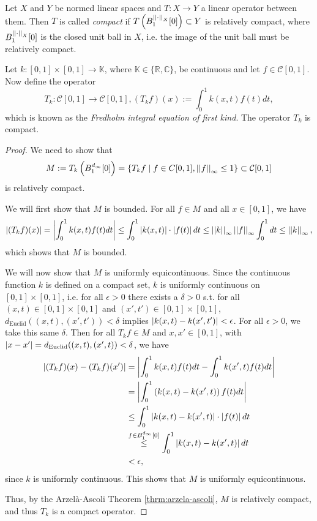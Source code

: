 \begin{defn}\label{defn:compact_operator}
	Let $X$ and $Y$ be normed linear spaces and $T: X\to Y$ a linear operator between them. Then $T$ is called \textit{compact} if $T\left(B^{\left\vert\left\vert \cdot \right\vert\right\vert_{X}}_{1}[0]\right) \subset Y$ is relatively compact, where $B_{1}^{\left\vert\left\vert \cdot \right\vert\right\vert_{X}}[0]$ is the closed unit ball in $X$, i.e. the image of the unit ball must be relatively compact.
\end{defn}

\begin{exmp}\label{exmp:compact-operator}
	Let $k: [0, 1]\times [0, 1]\to\mathbb K$, where $\mathbb K\in \{\mathbb R, \mathbb C\}$, be continuous and let $f\in \mathcal C[0, 1]$. Now define the operator
	\[
		T_k: \mathcal C[0, 1]\to\mathcal C[0, 1], (T_{k}f)(x) := \int_{0}^{1}k(x, t)f(t)dt,
	\]
	which is known as the \textit{Fredholm integral equation of first kind}. The operator $T_k$ is compact.
\end{exmp}

\begin{proof}
	We need to show that 
	\[
		M := T_k\left(B^{d_{\infty}}_{1}[0]\right) = \left\{ T_kf \mid f\in C[0, 1], \left\vert\left\vert f \right\vert\right\vert_{\infty} \leq 1 \right\} \subset \mathcal C[0, 1]
	\]
	is relatively compact. 
	
	We will first show that $M$ is bounded. For all $f\in M$ and all $x\in [0, 1]$, we have
	\begin{align*}
		\left\vert (T_kf)(x) \right\vert = \left\vert \int_{0}^{1} k(x, t)f(t)dt \right\vert \leq \int_{0}^{1}\left\vert k(x, t) \right\vert\cdot\left\vert f(t) \right\vert dt \leq \left\vert\left\vert k \right\vert\right\vert_{\infty}\left\vert\left\vert f \right\vert\right\vert_{\infty}\int_{0}^{1}dt \leq \left\vert\left\vert k \right\vert\right\vert_{\infty},
	\end{align*}
	which shows that $M$ is bounded.
	
	We will now show that $M$ is uniformly equicontinuous. Since the continuous function $k$ is defined on a compact set, $k$ is uniformly continuous on $[0, 1]\times [0, 1]$, i.e. for all $\epsilon > 0$ there exists a $\delta > 0$ s.t. for all $(x, t)\in [0, 1]\times [0, 1]$ and $(x', t')\in [0, 1]\times [0, 1]$, $d_{\text{Euclid}}((x, t), (x', t')) < \delta$ implies $\left\vert k(x, t) - k(x', t') \right\vert < \epsilon$. For all $\epsilon > 0$, we take this same $\delta$. Then for all $T_kf\in M$ and $x, x'\in [0, 1]$, with $\left\vert x - x' \right\vert = d_{\text{Euclid}}((x, t), (x', t)) < \delta$, we have
	\begin{align*}
		\left\vert (T_kf)(x) - (T_kf)(x') \right\vert &= \left\vert \int_{0}^{1}k(x, t)f(t)dt - \int_{0}^{1}k(x', t)f(t)dt \right\vert 
		\\ &= \left\vert \int_{0}^{1}\left(k(x, t) - k(x', t)\right)f(t)dt \right\vert
		\\ &\leq \int_{0}^{1}\left\vert k(x, t) - k(x', t) \right\vert\cdot \left\vert f(t) \right\vert dt
		\\ &\overset{f \in B_{1}^{d_{\infty}}[0]}{\leq} \int_{0}^{1}\left\vert k(x, t) - k(x', t) \right\vert dt
		\\ &< \epsilon, 
	\end{align*}
	since $k$ is uniformly continuous. This shows that $M$ is uniformly equicontinuous. 
	
	Thus, by the Arzel\`a-Ascoli Theorem \ref{thrm:arzela-ascoli}, $M$ is relatively compact, and thus $T_k$ is a compact operator. 
\end{proof}